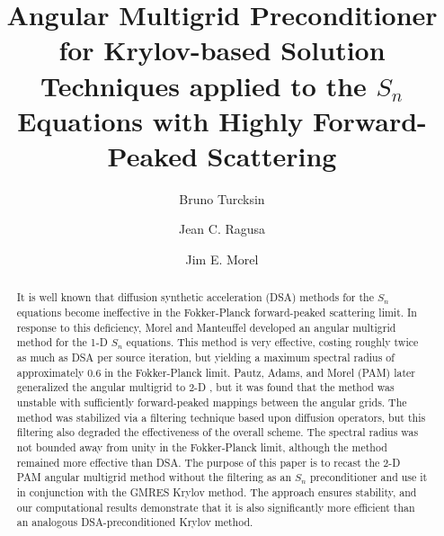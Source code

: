 \documentclass[preprint,10pt]{elsarticle}
\renewcommand{\(}{\left(}
\renewcommand{\)}{\right)}
\renewcommand{\[}{\left[}
\renewcommand{\]}{\right]}
\begin{document}
\begin{frontmatter}



\title{Angular Multigrid Preconditioner for Krylov-based Solution Techniques
applied to the $S_n$ Equations with Highly Forward-Peaked Scattering}

\author{Bruno Turcksin }

\author{Jean C. Ragusa}

\author{Jim E. Morel}

\address[label1]{Department of Nuclear Engineering, Texas A\&M University 
  College Station, TX 77843, USA }

 

\begin{abstract}
It is well known that diffusion synthetic acceleration (DSA) methods for the
$S_n$ equations become ineffective in the Fokker-Planck forward-peaked
scattering limit. In response to this deficiency, Morel and Manteuffel
\cite{multigrid_1d} developed an angular multigrid method for the 1-D $S_n$
equations. This method is very effective, costing roughly twice as much as DSA
per source iteration, but yielding a maximum spectral radius of approximately
$0.6$ in the Fokker-Planck limit. Pautz, Adams, and Morel (PAM) later
generalized the angular multigrid to 2-D \cite{multigrid_2d}, but it was found that the method was
unstable with sufficiently forward-peaked mappings between the angular grids.
The method was stabilized via a filtering technique based upon diffusion
operators, but this filtering also degraded the effectiveness of the overall
scheme. The spectral radius was not bounded away from unity in the
Fokker-Planck limit, although the method remained more effective than DSA. The
purpose of this paper is to recast the 2-D PAM angular multigrid method
without the filtering as an $S_n$ preconditioner and use it in conjunction
with the GMRES Krylov method. The approach ensures stability, and our
computational results demonstrate that it is also significantly more efficient
than an analogous DSA-preconditioned Krylov method.
\end{abstract}


\end{frontmatter}
\end{document}
